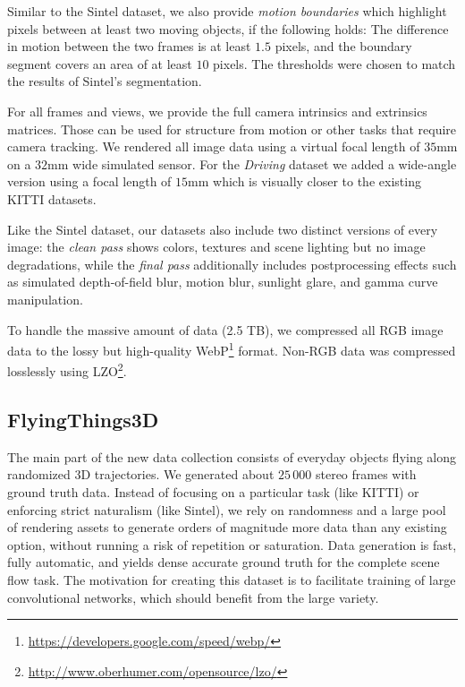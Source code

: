 \documentclass[10pt,twocolumn,letterpaper]{article}
\begin{document}
Similar to the Sintel dataset, we also provide \emph{motion boundaries} which highlight pixels between at least two moving objects, if the following holds: 
The difference in motion between the two frames is at least $1.5$ pixels, and the boundary segment covers an area of at least $10$ pixels.
The thresholds were chosen to match the results of Sintel's segmentation.

For all frames and views, we provide the full camera intrinsics and extrinsics matrices. 
Those can be used for structure from motion or other tasks that require camera tracking.
We rendered all image data using a virtual focal length of $35$mm on a $32$mm wide simulated sensor.
For the \emph{Driving} dataset we added a wide-angle version using a focal length of $15$mm which is visually closer to the existing KITTI datasets.

Like the Sintel dataset, our datasets also include two distinct versions of every image: the \emph{clean pass} shows colors, textures and scene lighting but no image degradations, while the \emph{final pass} additionally includes postprocessing effects such as simulated depth-of-field blur, motion blur, sunlight glare, and gamma curve manipulation.

To handle the massive amount of data (2.5 TB), we compressed all RGB image data to the lossy but high-quality  WebP\footnote{\url{https://developers.google.com/speed/webp/}} format.
Non-RGB data was compressed losslessly using LZO\footnote{\url{http://www.oberhumer.com/opensource/lzo/}}.

\subsection{FlyingThings3D}\label{sec:flyingthings3d}

The main part of the new data collection consists of everyday objects flying along randomized 3D trajectories.
We generated about $25\,000$ stereo frames with ground truth data.
Instead of focusing on a particular task (like KITTI) or enforcing strict naturalism (like Sintel), we rely on randomness and a large pool of rendering assets to generate orders of magnitude more data than any existing option, without running a risk of repetition or saturation.
Data generation is fast, fully automatic, and yields dense accurate ground truth for the complete scene flow task.
The motivation for creating this dataset is to facilitate training of large convolutional networks, which should benefit from the large variety.
\end{document}

